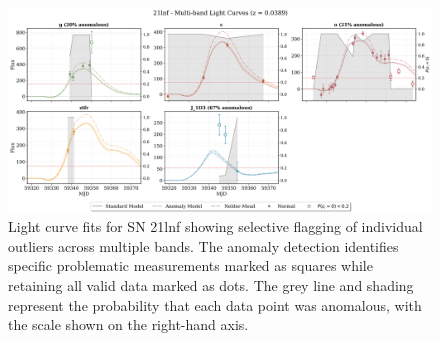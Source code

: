 \begin{figure}
\centering
\includegraphics[width=\textwidth]{images/21lnf_light_curves_all_paper.png}
\caption{Light curve fits for SN 21lnf showing selective flagging of individual outliers across multiple bands. The anomaly detection identifies specific problematic measurements marked as squares while retaining all valid data marked as dots. The grey line and shading represent the probability that each data point was anomalous, with the scale shown on the right-hand axis.}
\label{fig:21lnf_lightcurves}
\end{figure}
